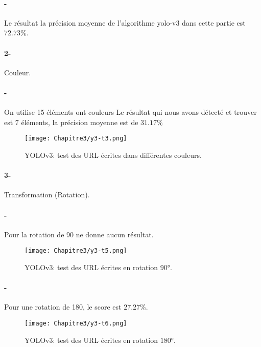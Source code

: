            \paragraph{-}Le résultat 
           la précision moyenne de l'algorithme yolo-v3 dans cette partie est $72.73\%$.

           \paragraph{2-} Couleur.
           \paragraph{-}  On utilise 15 éléments ont couleurs
            Le résultat qui nous avons détecté et trouver est 7 éléments,  la précision moyenne est de $31.17\%$
           \begin{figure}[H]
               \centering
                \texttt{[image: Chapitre3/y3-t3.png]}
                \caption{YOLOv3: test des URL écrites dans différentes couleurs.}
                \label{y3_t3}
                \end{figure}
           
           \paragraph{3-} Transformation (Rotation).
           \paragraph{-} Pour la rotation de 90 ne donne aucun résultat.
           \begin{figure}[H]
               \centering
                \texttt{[image: Chapitre3/y3-t5.png]}
                \caption{YOLOv3: test des URL écrites en rotation $90°$.}
                \label{y3_t5}
                \end{figure}
           
           \paragraph{-} Pour une rotation de 180, le score est $27.27\%$.
           \begin{figure}[H]
               \centering
                \texttt{[image: Chapitre3/y3-t6.png]}
                \caption{YOLOv3: test des URL écrites en rotation $180°$.}
                \label{y3_t6}
                \end{figure}


